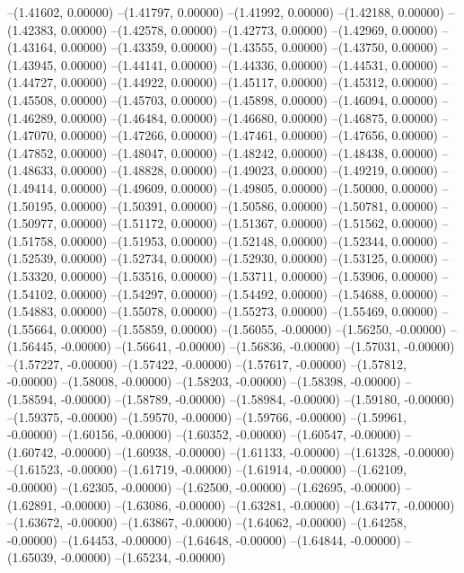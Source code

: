 --(1.41602, 0.00000)
--(1.41797, 0.00000)
--(1.41992, 0.00000)
--(1.42188, 0.00000)
--(1.42383, 0.00000)
--(1.42578, 0.00000)
--(1.42773, 0.00000)
--(1.42969, 0.00000)
--(1.43164, 0.00000)
--(1.43359, 0.00000)
--(1.43555, 0.00000)
--(1.43750, 0.00000)
--(1.43945, 0.00000)
--(1.44141, 0.00000)
--(1.44336, 0.00000)
--(1.44531, 0.00000)
--(1.44727, 0.00000)
--(1.44922, 0.00000)
--(1.45117, 0.00000)
--(1.45312, 0.00000)
--(1.45508, 0.00000)
--(1.45703, 0.00000)
--(1.45898, 0.00000)
--(1.46094, 0.00000)
--(1.46289, 0.00000)
--(1.46484, 0.00000)
--(1.46680, 0.00000)
--(1.46875, 0.00000)
--(1.47070, 0.00000)
--(1.47266, 0.00000)
--(1.47461, 0.00000)
--(1.47656, 0.00000)
--(1.47852, 0.00000)
--(1.48047, 0.00000)
--(1.48242, 0.00000)
--(1.48438, 0.00000)
--(1.48633, 0.00000)
--(1.48828, 0.00000)
--(1.49023, 0.00000)
--(1.49219, 0.00000)
--(1.49414, 0.00000)
--(1.49609, 0.00000)
--(1.49805, 0.00000)
--(1.50000, 0.00000)
--(1.50195, 0.00000)
--(1.50391, 0.00000)
--(1.50586, 0.00000)
--(1.50781, 0.00000)
--(1.50977, 0.00000)
--(1.51172, 0.00000)
--(1.51367, 0.00000)
--(1.51562, 0.00000)
--(1.51758, 0.00000)
--(1.51953, 0.00000)
--(1.52148, 0.00000)
--(1.52344, 0.00000)
--(1.52539, 0.00000)
--(1.52734, 0.00000)
--(1.52930, 0.00000)
--(1.53125, 0.00000)
--(1.53320, 0.00000)
--(1.53516, 0.00000)
--(1.53711, 0.00000)
--(1.53906, 0.00000)
--(1.54102, 0.00000)
--(1.54297, 0.00000)
--(1.54492, 0.00000)
--(1.54688, 0.00000)
--(1.54883, 0.00000)
--(1.55078, 0.00000)
--(1.55273, 0.00000)
--(1.55469, 0.00000)
--(1.55664, 0.00000)
--(1.55859, 0.00000)
--(1.56055, -0.00000)
--(1.56250, -0.00000)
--(1.56445, -0.00000)
--(1.56641, -0.00000)
--(1.56836, -0.00000)
--(1.57031, -0.00000)
--(1.57227, -0.00000)
--(1.57422, -0.00000)
--(1.57617, -0.00000)
--(1.57812, -0.00000)
--(1.58008, -0.00000)
--(1.58203, -0.00000)
--(1.58398, -0.00000)
--(1.58594, -0.00000)
--(1.58789, -0.00000)
--(1.58984, -0.00000)
--(1.59180, -0.00000)
--(1.59375, -0.00000)
--(1.59570, -0.00000)
--(1.59766, -0.00000)
--(1.59961, -0.00000)
--(1.60156, -0.00000)
--(1.60352, -0.00000)
--(1.60547, -0.00000)
--(1.60742, -0.00000)
--(1.60938, -0.00000)
--(1.61133, -0.00000)
--(1.61328, -0.00000)
--(1.61523, -0.00000)
--(1.61719, -0.00000)
--(1.61914, -0.00000)
--(1.62109, -0.00000)
--(1.62305, -0.00000)
--(1.62500, -0.00000)
--(1.62695, -0.00000)
--(1.62891, -0.00000)
--(1.63086, -0.00000)
--(1.63281, -0.00000)
--(1.63477, -0.00000)
--(1.63672, -0.00000)
--(1.63867, -0.00000)
--(1.64062, -0.00000)
--(1.64258, -0.00000)
--(1.64453, -0.00000)
--(1.64648, -0.00000)
--(1.64844, -0.00000)
--(1.65039, -0.00000)
--(1.65234, -0.00000)
